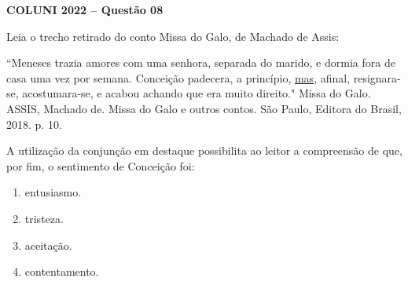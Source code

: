 \textbf{COLUNI 2022 -- Questão 08}\par\medskip Leia o trecho retirado do conto Missa do Galo, de Machado de Assis:

\par

“Meneses trazia amores com uma senhora, separada do marido, e dormia fora de casa uma vez por semana. Conceição padecera, a princípio, \underline{mas}, afinal, resignara-se, acostumara-se, e acabou achando que era muito direito." Missa do Galo. ASSIS, Machado de. Missa do Galo e outros contos. São Paulo, Editora do Brasil, 2018. p. 10.

\par

A utilização da conjunção em destaque possibilita ao leitor a compreensão de que, por fim, o sentimento de Conceição foi:\begin{enumerate}
\item entusiasmo.
\item tristeza.
\item aceitação.
\item contentamento.\end{enumerate}
